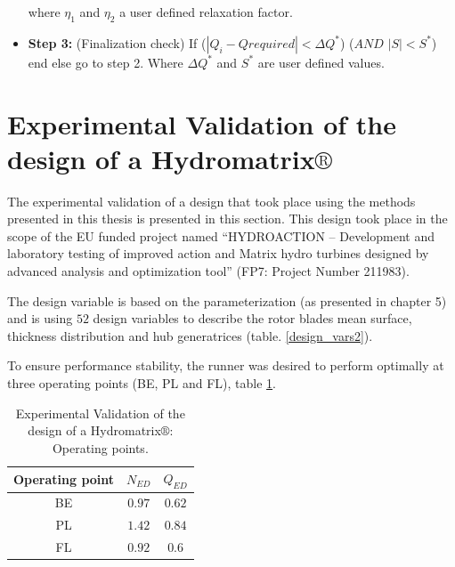 \begin{itemize}

where $\eta_1$ and $\eta_2$ a user defined relaxation factor. 

\item[]{\bf Step 3:} (Finalization check) If ($|Q_{i}-Q{required}|<\Delta Q^*$) ($AND$ $|S|<S^*$) end else go to step 2. Where $\Delta Q^*$ and $S^*$ are user defined values.
\end{itemize}



\FloatBarrier
\newpage
\section{Experimental Validation of the design of a Hydromatrix$\circledR$}

The experimental validation of a design that took place using the methods presented in this thesis is presented in this section. This design took place in the scope of the EU funded project named ``HYDROACTION – Development and laboratory testing of improved action and Matrix hydro turbines designed by advanced analysis and optimization tool'' (FP7: Project Number 211983). 


The design variable is based on the parameterization (as presented in chapter 5) and is using $52$ design variables to describe the rotor blades mean surface, thickness distribution and hub generatrices (table. \ref{design_vars2}). 


To ensure performance stability, the runner was desired to perform optimally at three operating points (BE, PL and FL), table \ref{epxer.ops}.

\begin{table}[h!]
\begin{center}
\begin{tabular}{ |c|c|c| }
\hline
Operating point & $N_{ED}$ & $Q_{ED}$\\
\hline
BE & $0.97$ & $0.62$\\
\hline
PL       & $1.42$ & $0.84$\\
\hline
FL       & $0.92$ & $0.6$\\
\hline
\end{tabular}
\caption{Experimental Validation of the design of a Hydromatrix$\circledR$: Operating points.}
\label{epxer.ops}
\end{center}
\end{table}

